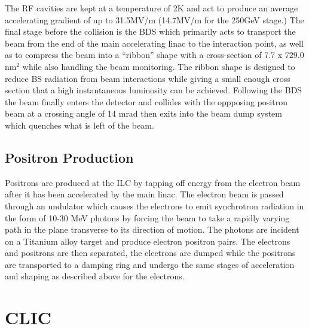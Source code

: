 The \ac{RF} cavities are kept at a temperature of 2K and act to produce an average accelerating gradient of up to 31.5MV/m (14.7MV/m for the 250GeV stage.)  The final stage before the collision is the \ac{BDS} which primarily acts to transport the beam from the end of the main accelerating linac to the interaction point, as well as to compress the beam into a ``ribbon'' shape with a cross-section of 7.7 x 729.0 nm$^2$ while also handling the beam monitoring. The ribbon shape is designed to reduce \ac{BS} radiation from beam interactions while giving a small enough cross section that a high instantaneous luminosity can be achieved. Following the \ac{BDS} the beam finally enters the detector and collides with the oppposing positron beam at a crossing angle of 14 mrad then exits into the beam dump system which quenches what is left of the beam.

\subsection{Positron Production}
Positrons are produced at the \ac{ILC} by tapping off energy from the electron beam after it has been accelerated by the main linac. The electron beam is passed through an undulator which causes the electrons to emit synchrotron radiation in the form of 10-30 MeV photons by forcing the beam to take a rapidly varying path in the plane transverse to its direction of motion. The photons are incident on a Titanium alloy target and produce electron positron pairs. The electrons and positrons are then separated, the electrons are dumped while the positrons are transported to a damping ring and undergo the same stages of acceleration and shaping as described above for the electrons.

\section{CLIC}


